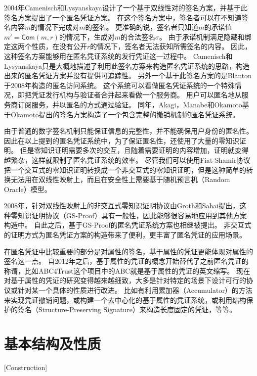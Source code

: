 2004年Camenisch和Lysyanskaya设计了一个基于双线性对的签名方案，并基于此签名方案提出了一个匿名凭证方案\cite{camenisch2004signature}。
在这个签名方案中，签名者可以在不知道签名内容$m$的情况下完成对$m$的签名。
更准确的说，签名者只知道$m$的承诺值$m'=\mathsf{Com}(m,r)$的情况下，生成对$m$的合法签名$\sigma$。
由于承诺机制满足隐藏和绑定这两个性质，在没有公开$r$的情况下，签名者无法获知所需签名的内容。
因此，这种签名方案能够用在匿名凭证系统的发行凭证这一过程中。
Camenisch和Lysyanskaya只是大概地描述了利用此签名方案来构造匿名凭证系统的思路，构造出来的匿名凭证方案并没有提供可追踪性。
另外一个基于此签名方案的是Blanton于2008年构造的匿名访问系统\cite{blanton2008online}。
这个系统可以看做匿名凭证系统的一个特殊情况，即把凭证发行机构与验证者合并起来看做一个服务商。
用户可以匿名地从服务商订阅服务，并以匿名的方式通过验证。
同年，Akagi，Manabe和Okamoto基于Okamoto提出的签名方案\cite{okamoto2006efficient}构造了一个包含完整的撤销机制的匿名凭证系统\cite{akagi2008efficient}。

由于普通的数字签名机制只能保证信息的完整性，并不能确保用户身份的匿名性。
因此在以上提到的匿名凭证系统中，为了保证匿名性，还使用了大量的零知识证明。
但是零知识证明需要多次的交互，且随着需要证明的内容增加，证明就变得越繁杂，这样就限制了匿名凭证系统的效率。
尽管我们可以使用Fiat-Shamir协议\cite{fiat1986prove}把一个交互式的零知识证明转换成一个非交互式的零知识证明，但是这种简单的转换无法用在双线性映射上\cite{张严2012匿名凭证方案研究进展}，而且在安全性上需要基于随机预言机（Random Oracle）模型。

2008年，针对双线性映射上的非交互式零知识证明协议\cite{groth2008efficient}由Groth和Sahai提出，这种零知识证明协议（GS-Proof）具有一般性，因此能够很容易地应用到其他方案构造中。
自此之后，基于GS-Proof的匿名凭证系统方案也相继被提出\cite{belenkiy2008p,belenkiy2009randomizable}。
非交互式的证明方式为匿名凭证方案的构造带来了便利，更丰富了匿名凭证的应用场景。

在匿名凭证中比较重要的部分是对属性的签名，基于属性的凭证更能体现对属性的签名这一点。
自2012年之后，基于属性的凭证的概念开始替代了之前匿名凭证的称谓\cite{sabouri2012attribute}，比如ABC4Trust这个项目中的ABC就是基于属性的凭证的英文缩写。
现在对基于属性的凭证的研究变得越来越细致，大多是针对特定的场景下设计可行的协议或针对某一个具体的性质进行改进。
比如有利用累加器（Accumulator）的方法来实现凭证撤销问题\cite{camenisch2009accumulator}，或构建一个去中心化的基于属性的凭证系统\cite{garman2014decentralized}，或利用结构保护的签名（Structure-Preserving Signature）来构造长度固定的凭证\cite{fuchsbauer2018structure}，等等。

\section{基本结构及性质}[Construction]

